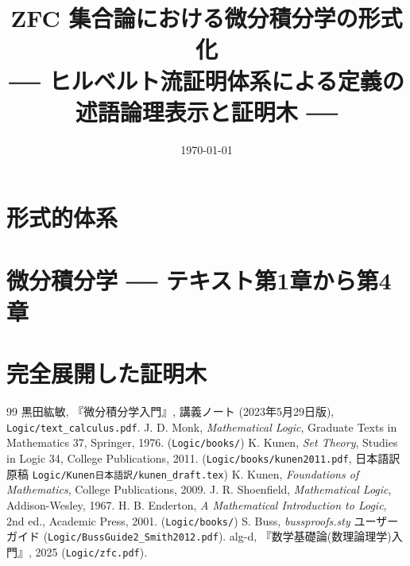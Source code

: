 \documentclass[a4j,11pt,dvipdfmx,oneside]{jsreport}
\title{ZFC 集合論における微分積分学の形式化 \\[2mm] \large ── ヒルベルト流証明体系による定義の述語論理表示と証明木 ──}
\author{}
\date{\today}
\begin{document}
\maketitle
\tableofcontents



\part{形式的体系}\label{part:formal}







\part{微分積分学 ── テキスト第1章から第4章}\label{part:text}





\part{完全展開した証明木}\label{part:trees}


\appendix


\begin{thebibliography}{99}
   黒田紘敏, 『微分積分学入門』, 講義ノート (2023年5月29日版), \texttt{Logic/text\_calculus.pdf}.
   J. D. Monk, \emph{Mathematical Logic}, Graduate Texts in Mathematics 37, Springer, 1976. (\texttt{Logic/books/})
   K. Kunen, \emph{Set Theory}, Studies in Logic 34, College Publications, 2011. (\texttt{Logic/books/kunen2011.pdf}, 日本語訳原稿 \texttt{Logic/Kunen日本語訳/kunen\_draft.tex})
   K. Kunen, \emph{Foundations of Mathematics}, College Publications, 2009.
   J. R. Shoenfield, \emph{Mathematical Logic}, Addison-Wesley, 1967.
   H. B. Enderton, \emph{A Mathematical Introduction to Logic}, 2nd ed., Academic Press, 2001. (\texttt{Logic/books/})
   S. Buss, \emph{bussproofs.sty} ユーザーガイド (\texttt{Logic/BussGuide2\_Smith2012.pdf}).
   alg-d, 『数学基礎論(数理論理学)入門』, 2025 (\texttt{Logic/zfc.pdf}).
\end{thebibliography}
\end{document}
